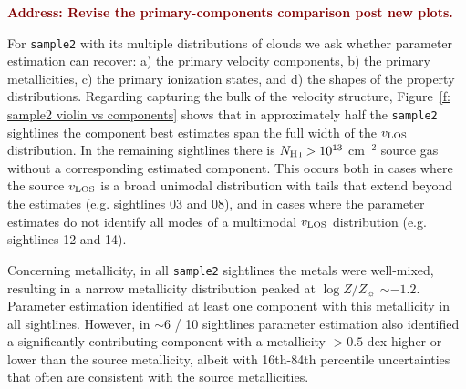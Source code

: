\documentclass[fleqn,usenatbib]{mnras}
\newcommand{\todo}[1]{\textcolor{Maroon}{\textbf{Address: #1}}}
\newcommand{\metallicity}{$\log Z/Z_{\sun}$}
\begin{document}
\todo{Revise the primary-components comparison post new plots.}

For \texttt{sample2} with its multiple distributions of clouds we ask whether parameter estimation can recover:
a) the primary velocity components,
b) the primary metallicities,
c) the primary ionization states, and
d) the shapes of the property distributions.
Regarding capturing the bulk of the velocity structure, Figure~\ref{f: sample2 violin vs components} shows that in approximately half the \texttt{sample2} sightlines the component best estimates span the full width of the $v_{\rm LOS}$ distribution.
In the remaining sightlines there is $N_{\ion{H}{I}}>10^{13}$ cm$^{-2}$ source gas without a corresponding estimated component.
This occurs both in cases where the source $v_{\rm LOS}$ is a broad unimodal distribution with tails that extend beyond the estimates (e.g. sightlines 03 and 08),
and in cases where the parameter estimates do not identify all modes of a multimodal $v_{\rm LOS}$ distribution (e.g. sightlines 12 and 14).

Concerning metallicity, in all \texttt{sample2} sightlines the metals were well-mixed, resulting in a narrow metallicity distribution peaked at {\metallicity} $\sim -1.2$.
Parameter estimation identified at least one component with this metallicity in all sightlines.
However, in $\sim 6$ / 10 sightlines parameter estimation also identified a significantly-contributing component with a metallicity $>0.5$ dex higher or lower than the source metallicity,
albeit with 16th-84th percentile uncertainties that often are consistent with the source metallicities.
\end{document}
